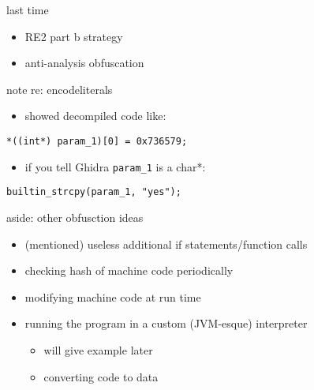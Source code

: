 \date{}
\title{}
\date{}

\begin{frame}
    \titlepage
\end{frame}

\usetikzlibrary{calc} %


\begin{frame}{last time}
    \begin{itemize}
    \item RE2 part b strategy
    \item anti-analysis obfuscation

    \end{itemize}
\end{frame}

\begin{frame}[fragile]{note re: encodeliterals}
    \begin{itemize}
    \item showed decompiled code like:
    \end{itemize}
\begin{Verbatim}[fontsize=\small]
*((int*) param_1)[0] = 0x736579;
\end{Verbatim}
    \begin{itemize}
    \item if you tell Ghidra \texttt{param\_1} is a char*:
    \end{itemize}
\begin{Verbatim}[fontsize=\small]
builtin_strcpy(param_1, "yes");
\end{Verbatim}
\end{frame}

\begin{frame}{aside: other obfusction ideas}
    \begin{itemize}
    \item (mentioned) useless additional if statements/function calls
    \item checking hash of machine code periodically
    \item modifying machine code at run time
    \item running the program in a custom (JVM-esque) interpreter
        \begin{itemize}
        \item will give example later
        \item converting code to data
        \end{itemize}
    \end{itemize}
\end{frame}

